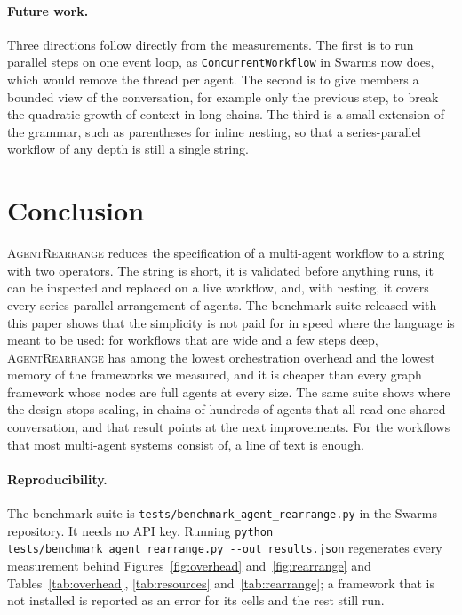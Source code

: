 \documentclass[11pt]{article}
\newcommand{\code}[1]{\texttt{#1}}
\newcommand{\AR}{\textsc{AgentRearrange}}
\begin{document}
\paragraph{Future work.}
Three directions follow directly from the measurements. The first is to run parallel steps on one event loop, as \code{ConcurrentWorkflow} in Swarms now does, which would remove the thread per agent. The second is to give members a bounded view of the conversation, for example only the previous step, to break the quadratic growth of context in long chains. The third is a small extension of the grammar, such as parentheses for inline nesting, so that a series-parallel workflow of any depth is still a single string.

\section{Conclusion}

\AR{} reduces the specification of a multi-agent workflow to a string with two operators. The string is short, it is validated before anything runs, it can be inspected and replaced on a live workflow, and, with nesting, it covers every series-parallel arrangement of agents. The benchmark suite released with this paper shows that the simplicity is not paid for in speed where the language is meant to be used: for workflows that are wide and a few steps deep, \AR{} has among the lowest orchestration overhead and the lowest memory of the frameworks we measured, and it is cheaper than every graph framework whose nodes are full agents at every size. The same suite shows where the design stops scaling, in chains of hundreds of agents that all read one shared conversation, and that result points at the next improvements. For the workflows that most multi-agent systems consist of, a line of text is enough.

\paragraph{Reproducibility.}
The benchmark suite is \code{tests/benchmark\_agent\_rearrange.py} in the Swarms repository. It needs no API key. Running \code{python tests/benchmark\_agent\_rearrange.py -{}-out results.json} regenerates every measurement behind Figures~\ref{fig:overhead} and~\ref{fig:rearrange} and Tables~\ref{tab:overhead}, \ref{tab:resources} and~\ref{tab:rearrange}; a framework that is not installed is reported as an error for its cells and the rest still run.
\end{document}
